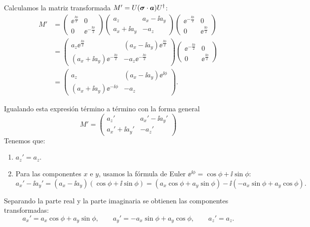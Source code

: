 \begin{resolucion}
Calculamos la matriz transformada $M' = U (\bm{\sigma} \cdot \bm{a}) U^\dagger$:
\begin{align*}
M' &= \begin{pmatrix} \ee^{\frac{\ii\phi}{2}} & 0 \\ 0 & \ee^{-\frac{\ii\phi}{2}} \end{pmatrix} \begin{pmatrix} a_z & a_x - \ii a_y \\ a_x + \ii a_y & -a_z \end{pmatrix} \begin{pmatrix} \ee^{-\frac{\ii\phi}{2}} & 0 \\ 0 & \ee^{\frac{\ii\phi}{2}} \end{pmatrix} \\
&= \begin{pmatrix} a_z \ee^{\frac{\ii\phi}{2}} & (a_x - \ii a_y)\ee^{\frac{\ii\phi}{2}} \\ (a_x + \ii a_y)\ee^{-\frac{\ii\phi}{2}} & -a_z \ee^{-\frac{\ii\phi}{2}} \end{pmatrix} \begin{pmatrix} \ee^{-\frac{\ii\phi}{2}} & 0 \\ 0 & \ee^{\frac{\ii\phi}{2}} \end{pmatrix} \\
&= \begin{pmatrix} a_z & (a_x - \ii a_y)\ee^{\ii\phi} \\ (a_x + \ii a_y)\ee^{-\ii\phi} & -a_z \end{pmatrix}.
\end{align*}

Igualando esta expresión término a término con la forma general
\[
M' = \begin{pmatrix} a_z' & a_x' - \ii a_y' \\ a_x' + \ii a_y' & -a_z' \end{pmatrix}
\]
Tenemos que:
\begin{enumerate}
  \item $a_z' = a_z$.
  \item Para las componentes $x$ e $y$, usamos la fórmula de Euler $\ee^{\ii\phi} = \cos\phi + \ii \sin\phi$:
  \[
  a_x' - \ii a_y' = (a_x - \ii a_y)(\cos\phi + \ii \sin\phi) = (a_x \cos\phi + a_y \sin\phi) - \ii (-a_x \sin\phi + a_y \cos\phi).
  \]
\end{enumerate}

Separando la parte real y la parte imaginaria se obtienen las componentes transformadas:
\[
a_x' = a_x \cos\phi + a_y \sin\phi, \qquad a_y' = -a_x \sin\phi + a_y \cos\phi, \qquad a_z' = a_z.
\]


\end{resolucion}
